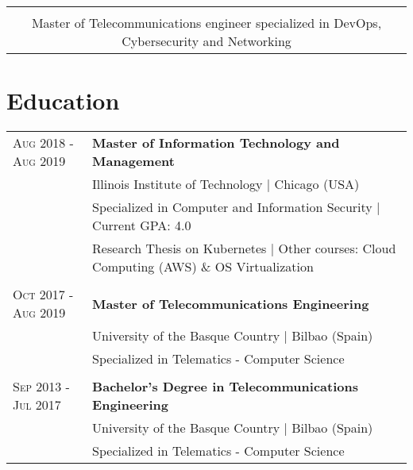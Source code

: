 \documentclass[a4paper,10pt]{article}
\begin{document}
\vspace{-.00in}

\begin{center}
\begin{tabular}{c}
  \hline \\[-0.8em]
  Master of Telecommunications engineer specialized in DevOps, Cybersecurity and Networking
\end{tabular}
\end{center}


\renewcommand{\arraystretch}{0.7}%
\section{Education}
\begin{tabular}{p{3.2cm}l}

 \textsc{Aug 2018 - Aug 2019}& \textbf{Master of Information Technology and Management}\\
 & \footnotesize{Illinois Institute of Technology | Chicago (USA)} \\
 & Specialized in Computer and Information Security | Current GPA: 4.0 \\ 
 & \footnotesize{Research Thesis on Kubernetes | Other courses: Cloud Computing (AWS) \& OS Virtualization} \\ &\\[-0.05in]

 \textsc{Oct 2017 - Aug 2019}& \textbf{Master of Telecommunications Engineering}\\
 & \footnotesize{University of the Basque Country | Bilbao (Spain)} \\
 & Specialized in Telematics - Computer Science \\ &\\[-0.05in]
 
 \textsc{Sep 2013 - Jul 2017}& \textbf{Bachelor's Degree in Telecommunications Engineering}\\
 & \footnotesize{University of the Basque Country | Bilbao (Spain)} \\
 & Specialized in Telematics - Computer Science 

\end{tabular}
\end{document}
